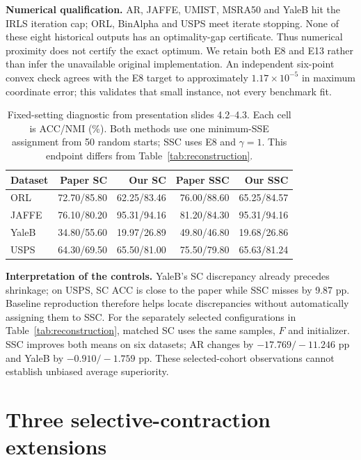 {\noindent\textbf{Numerical qualification.}
AR, JAFFE, UMIST, MSRA50 and YaleB hit the IRLS iteration cap; ORL, BinAlpha
and USPS meet iterate stopping. None of these eight historical outputs has an
optimality-gap certificate. Thus numerical proximity does not certify the exact
optimum. We retain both E8 and E13 rather than infer the unavailable original
implementation. An independent six-point convex check agrees with the E8
target to approximately $1.17\times10^{-5}$ in maximum coordinate error;
this validates that small instance, not every benchmark fit.

\begin{table}[!htbp]
\centering
\caption{Fixed-setting diagnostic from presentation slides 4.2--4.3.
Each cell is ACC/NMI (\%). Both methods use one minimum-SSE assignment from
50 random starts; SSC uses E8 and $\gamma=1$. This endpoint differs from
Table~\ref{tab:reconstruction}.}
\label{tab:baseline_diagnostic}
\small
\setlength{\tabcolsep}{5pt}
\begin{tabular}{@{}lrrrr@{}}
\toprule
Dataset & Paper SC & Our SC & Paper SSC & Our SSC \\
\midrule
ORL & 72.70/85.80 & 62.25/83.46 & 76.00/88.60 & 65.25/84.57 \\
JAFFE & 76.10/80.20 & 95.31/94.16 & 81.20/84.30 & 95.31/94.16 \\
YaleB & 34.80/55.60 & 19.97/26.89 & 49.80/46.80 & 19.68/26.86 \\
USPS & 64.30/69.50 & 65.50/81.00 & 75.50/79.80 & 65.63/81.24 \\
\bottomrule
\end{tabular}
\end{table}

\noindent\textbf{Interpretation of the controls.}
YaleB's SC discrepancy already precedes shrinkage; on USPS, SC ACC is close
to the paper while SSC misses by 9.87 pp. Baseline reproduction therefore
helps locate discrepancies without automatically assigning them to SSC.
For the separately selected configurations in Table~\ref{tab:reconstruction},
matched SC uses the same samples, $F$ and initializer. SSC improves both means
on six datasets; AR changes by $-17.769/-11.246$ pp and YaleB by
$-0.910/-1.759$ pp. These selected-cohort observations cannot establish
unbiased average superiority.

\clearpage
\section{Three selective-contraction extensions}
\label{app:extensions}

}
